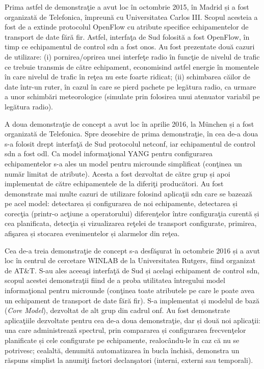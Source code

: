 Prima astfel de demonstraţie a avut loc în octombrie 2015, în Madrid și a fost organizată de Telefonica, împreună cu Universitatea Carlos III. Scopul acesteia a fost de a extinde protocolul OpenFlow cu atribute specifice echipamentelor de transport de date fără fir. Astfel, interfaţa de Sud folosită a fost OpenFlow, în timp ce echipamentul de control \gls{sdn} a fost \gls{onos}. Au fost prezentate două cazuri de utilizare: (i) pornirea/oprirea unei interfeţe radio în funcţie de nivelul de trafic ce trebuie transmis de către echipament, economisind astfel energie în momentele în care nivelul de trafic în reţea nu este foarte ridicat; (ii) schimbarea căilor de date într-un ruter, în cazul în care se pierd pachete pe legătura radio, ca urmare a unor schimbări meteorologice (simulate prin folosirea unui atenuator variabil pe legătura radio).

A doua demonstraţie de concept a avut loc în aprilie 2016, la München și a fost organizată de Telefonica. Spre deosebire de prima demonstraţie, în cea de-a doua s-a folosit drept interfaţă de Sud protocolul \gls{netconf}, iar echipamentul de control \gls{sdn} a fost \gls{odl}. Ca model informaţional YANG pentru configurarea echipamentelor s-a ales un model pentru microunde simplificat (conţinea un număr limitat de atribute). Acesta a fost dezvoltat de către grup și apoi implementat de către echipamentele de la diferiţi producători. Au fost demonstrate mai multe cazuri de utilizare folosind aplicaţii \gls{sdn} care se bazează pe acel model: detectarea și configurarea de noi echipamente, detectarea și corecţia (printr-o acţiune a operatorului) diferenţelor între configuraţia curentă și cea planificata, detecţia și vizualizarea reţelei de transport configurate, primirea, afişarea și stocarea evenimentelor și alarmelor din reţea.

Cea de-a treia demonstraţie de concept s-a desfăşurat în octombrie 2016 și a avut loc în centrul de cercetare WINLAB de la Universitatea Rutgers, fiind organizat de AT\&T. S-au ales aceeaşi interfaţă de Sud și acelaşi echipament de control \gls{sdn}, scopul acestei demonstraţii fiind de a proba utilitatea întregului model informaţional pentru microunde (conţinea toate atributele pe care le poate avea un echipament de transport de date fără fir). S-a implementat și modelul de bază (\textit{Core Model}), dezvoltat de alt grup din cadrul \gls{onf}. Au fost demonstrate aplicaţiile dezvoltate pentru cea de-a doua demonstraţie, dar și două noi aplicaţii: una care administrează spectrul, prin compararea și configurarea frecvenţelor planificate și cele configurate pe echipamente, realocându-le în caz că nu se potrivesc; cealaltă, denumită automatizarea în bucla închisă, demonstra un răspuns simplist la anumiţi factori declanşatori (interni, externi sau temporali).

